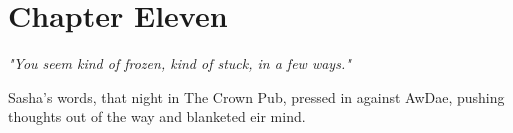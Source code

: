 \chapter*{Chapter Eleven}

\emph{"You seem kind of frozen, kind of stuck, in a few ways."}

Sasha's words, that night in The Crown Pub, pressed in against AwDae, pushing thoughts out of the way and blanketed eir mind.

